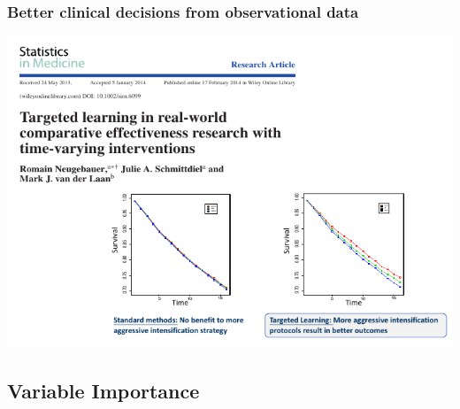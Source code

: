 \documentclass[t]{beamer}
\begin{document}
\begin{frame}
\frametitle{Better clinical decisions from observational data}
\vspace{-20pt}
\begin{center}
  \includegraphics[width = 1.02\textwidth]{figures/diabetes.pdf}
  \end{center}
\end{frame}


\subsection{Variable Importance}
\end{document}
